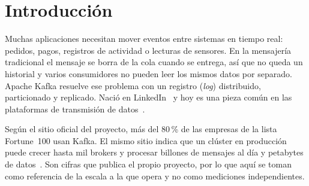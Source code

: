 \documentclass[12pt,a4paper]{article}
\begin{document}
\begin{abstract}
Las arquitecturas orientadas a eventos y la transmisión de datos en tiempo real han desplazado a la mensajería tradicional en muchos escenarios, y Apache Kafka se ha convertido en una de sus plataformas de referencia frente a brokers de colas como RabbitMQ. Este informe analiza Kafka con los conceptos de la Unidad~1 (transparencias, modelos de comunicación, tolerancia a fallos, replicación y los modelos CAP y PACELC) a partir de un experimento propio: un clúster de tres nodos en modo KRaft desplegado con Docker, con el tópico \texttt{pedidos} replicado tres veces, \texttt{acks=all} y \texttt{min.insync.replicas=2}. Al detener el líder de una partición, el clúster eligió un nuevo líder, el conjunto de réplicas sincronizadas bajó de 3 a 2 y las escrituras continuaron sin pérdida de mensajes; con solo uno de los tres nodos activos, el productor recibió \texttt{NOT\_ENOUGH\_REPLICAS} y la escritura fue rechazada, un comportamiento CP que antepone la durabilidad a la disponibilidad. Se concluye que Kafka conviene para la ingesta masiva y el reprocesamiento histórico de eventos, mientras que RabbitMQ resulta más adecuado para colas de tareas con enrutamiento fino y baja latencia por mensaje.
\end{abstract}
\newpage
\tableofcontents
\newpage

\section{Introducción}\label{sec:introduccion}
Muchas aplicaciones necesitan mover eventos entre sistemas en tiempo real: pedidos, pagos, registros de actividad o lecturas de sensores. En la mensajería tradicional el mensaje se borra de la cola cuando se entrega, así que no queda un historial y varios consumidores no pueden leer los mismos datos por separado. Apache Kafka resuelve ese problema con un registro (\textit{log}) distribuido, particionado y replicado. Nació en LinkedIn~\cite{Wang2015} y hoy es una pieza común en las plataformas de transmisión de datos~\cite{Raptis2023}.

Según el sitio oficial del proyecto, más del 80\,\% de las empresas de la lista Fortune~100 usan Kafka. El mismo sitio indica que un clúster en producción puede crecer hasta mil brokers y procesar billones de mensajes al día y petabytes de datos~\cite{KafkaHome}. Son cifras que publica el propio proyecto, por lo que aquí se toman como referencia de la escala a la que opera y no como mediciones independientes.
\end{document}
